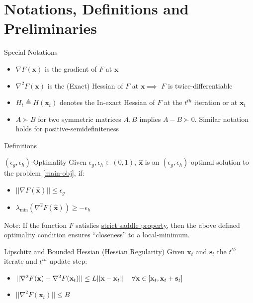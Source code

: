 \documentclass{beamer}
\newcommand{\h}{\nabla^{2}}
\newcommand{\g}{\nabla}
\newcommand{\xbold}{\mathbf{x}}
\begin{document}
\section{Notations, Definitions and Preliminaries}
\begin{frame}{Special Notations}
\begin{itemize}
\item<1->{\(\g F(\xbold)\) is the gradient of \(F\) at \(\xbold\)}
\item<2->{\(\h F(\xbold)\) is the (Exact) Hessian of \(F\) at \(\xbold \implies\) \(F\) is twice-differentiable}
\item<3->{\(H_{t} \triangleq H(\xbold_{t})\) denotes the In-exact Hessian of \(F\) at the \(t^{th}\) iteration or at \(\xbold_{t}\)}
\item<4->{\(A \succ B\) for two symmetric matrices \(A, B\) implies \(A - B \succ 0\). Similar notation holds for positive-semidefiniteness}
\end{itemize}
\end{frame}

\begin{frame}{Definitions}
\begin{alertblock}{\((\epsilon_{g}, \epsilon_{h})\)-Optimality}
\label{sec-opt}
Given \(\epsilon_{g}, \epsilon_{h} \in (0, 1)\), \(\mathbf{\hat{x}}\) is an \((\epsilon_{g}, \epsilon_{h})\)-optimal solution to the problem \ref{main-obj}, if:
\begin{itemize}
\item \(||\g F(\mathbf{\hat{x}}) || \leq \epsilon_{g}\)
\item \(\lambda_{\min} (\h F(\mathbf{\hat{x}})) \geq -\epsilon_{h}\)
\end{itemize}
\end{alertblock}
\pause
Note: If the function \(F\) satisfies \underline{strict saddle property}, then the above defined optimality condition ensures ``closeness'' to a local-minimum. %
\pause
\begin{alertblock}{Lipschitz and Bounded Hessian (Hessian Regularity)}
Given \(\xbold_{t}\) and \(\mathbf{s}_{t}\) the \(t^{th}\) iterate and \(t^{th}\) update step:
\begin{itemize}
\item \(||\h F(\xbold) - \h F(\xbold_{t})|| \leq L||\xbold - \xbold_{t}|| \hspace{4mm} \forall \xbold \in [\xbold_{t}, \xbold_{t} + \mathbf{s}_{t}]\)
\item \(||\h F(\xbold_{t}) || \leq B\)
\end{itemize}
\end{alertblock}
\end{frame}
\end{document}
